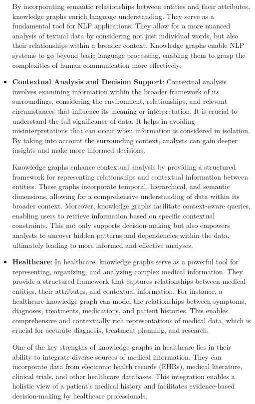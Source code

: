 \begin{itemize}
    By incorporating semantic relationships between entities and their attributes, knowledge graphs enrich language understanding. They serve as a fundamental tool for NLP applications. They allow for a more nuanced analysis of textual data by considering not just individual words, but also their relationships within a broader context. Knowledge graphs enable NLP systems to go beyond basic language processing, enabling them to grasp the complexities of human communication more effectively.
   

    \item \textbf{Contextual Analysis and Decision Support}:
    Contextual analysis involves examining information within the broader framework of its surroundings, considering the environment, relationships, and relevant circumstances that influence its meaning or interpretation. It is crucial to understand the full significance of data. It helps in avoiding misinterpretations that can occur when information is considered in isolation. By taking into account the surrounding context, analysts can gain deeper insights and make more informed decisions. 
    
    Knowledge graphs enhance contextual analysis by providing a structured framework for representing relationships and contextual information between entities. These graphs incorporate temporal, hierarchical, and semantic dimensions, allowing for a comprehensive understanding of data within its broader context. Moreover, knowledge graphs facilitate context-aware queries, enabling users to retrieve information based on specific contextual constraints. This not only supports decision-making but also empowers analysts to uncover hidden patterns and dependencies within the data, ultimately leading to more informed and effective analyses.

    \item \textbf{Healthcare}:
    In healthcare, knowledge graphs serve as a powerful tool for representing, organizing, and analyzing complex medical information. They provide a structured framework that captures relationships between medical entities, their attributes, and contextual information. For instance, a healthcare knowledge graph can model the relationships between symptoms, diagnoses, treatments, medications, and patient histories. This enables comprehensive and contextually rich representations of medical data, which is crucial for accurate diagnosis, treatment planning, and research.

    One of the key strengths of knowledge graphs in healthcare lies in their ability to integrate diverse sources of medical information. They can incorporate data from electronic health records (EHRs), medical literature, clinical trials, and other healthcare databases. This integration enables a holistic view of a patient's medical history and facilitates evidence-based decision-making by healthcare professionals.
    

\end{itemize}
